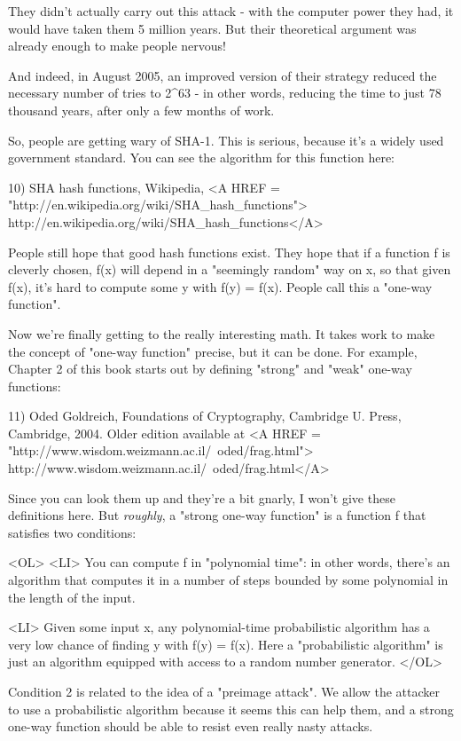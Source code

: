 They didn't actually carry out this attack - with the computer power 
they had, it would have taken them 5 million years.  But their
theoretical argument was already enough to make people nervous!  

And indeed, in August 2005, an improved version of their strategy
reduced the necessary number of tries to 2^{63} - in other words,
reducing the time to just 78 thousand years, after only a few months 
of work.

So, people are getting wary of SHA-1.  This is serious, because it's
a widely used government standard.  You can see the algorithm for this
function here:

10) SHA hash functions, Wikipedia, 
<A HREF = "http://en.wikipedia.org/wiki/SHA_hash_functions">
http://en.wikipedia.org/wiki/SHA_hash_functions</A>

People still hope that good hash functions exist.  They hope that if 
a function f is cleverly chosen, f(x) will depend in a "seemingly 
random" way on x, so that given f(x), it's hard to compute some y 
with f(y) = f(x).  People call this a "one-way function".  

Now we're finally getting to the really interesting math.  It takes work 
to make the concept of "one-way function" precise, but it can be done.
For example, Chapter 2 of this book starts out by defining "strong" and 
"weak" one-way functions:

11) Oded Goldreich, Foundations of Cryptography, Cambridge U.
Press, Cambridge, 2004.  Older edition available at 
<A HREF = "http://www.wisdom.weizmann.ac.il/~oded/frag.html"> 
http://www.wisdom.weizmann.ac.il/~oded/frag.html</A> 

Since you can look them up and they're a bit gnarly, I won't give
these definitions here.  But \emph{roughly}, a "strong one-way function"  
is a function f that satisfies two conditions:

<OL>
<LI>
 You can compute f in "polynomial time": in other words,
 there's an algorithm that computes it in a number of steps
 bounded by some polynomial in the length of the input.

<LI>
 Given some input x, any polynomial-time probabilistic algorithm 
 has a very low chance of finding y with f(y) = f(x).  Here a 
 "probabilistic algorithm" is just an algorithm equipped with 
 access to a random number generator.
</OL>

Condition 2 is related to the idea of a "preimage attack".
We allow the attacker to use a probabilistic algorithm because
it seems this can help them, and a strong one-way function 
should be able to resist even really nasty attacks.

